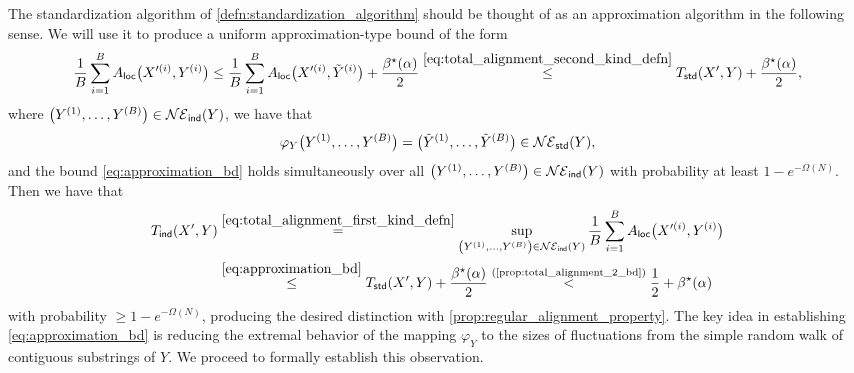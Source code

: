 \documentclass[11pt]{amsart}
\numberwithin{equation}{section}
\numberwithin{equation}{section}
\newcommand{\1}{\mathbbm{1}}
\newcommand{\ind}{\textup{\textsf{ind}}}
\newcommand{\std}{\textup{\textsf{std}}}
\newcommand{\loc}{\textup{\textsf{loc}}}
\theoremstyle{definition}
\begin{document}
The standardization algorithm of \cref{defn:standardization_algorithm} should be thought of as an approximation algorithm in the following sense. We will use it to produce a uniform approximation-type bound of the form
\begin{align} \label{eq:approximation_bd}
    \frac{1}{B}\sum_{i=1}^B A_\loc\big(X'^{(i)}, Y^{(i)}\big) \leq \frac{1}{B} \sum_{i=1}^B A_\loc\big(X'^{(i)}, \tilde{Y}^{(i)}\big) + \frac{\beta^\star(\alpha)}{2} \stackrel{\eqref{eq:total_alignment_second_kind_defn}}{\leq} T_\std(X', Y) + \frac{\beta^\star(\alpha)}{2},
\end{align}
where $\big( Y^{(1)}, \dots, Y^{(B)} \big) \in \mathcal{NE}_\ind(Y)$, we have that
\begin{align*}
    \varphi_{Y}\big( Y^{(1)}, \dots, Y^{(B)} \big) = \big( \Tilde{Y}^{(1)}, \dots, \Tilde{Y}^{(B)} \big) \in \mathcal{NE}_\std(Y),
\end{align*}
and the bound \eqref{eq:approximation_bd} holds simultaneously over all $\big( Y^{(1)}, \dots, Y^{(B)} \big) \in \mathcal{NE}_\ind(Y)$ with probability at least $1 - e^{-\Omega(N)}$. Then we have that
\begin{align}
    T_\ind(X', Y) & \stackrel{\eqref{eq:total_alignment_first_kind_defn}}{=} \sup_{\left( Y^{(1)}, \dots, Y^{(B)} \right) \in \mathcal{NE}_\ind(Y)} \frac{1}{B}\sum_{i=1}^B A_\loc\big(X'^{(i)}, Y^{(i)}\big) \nonumber \\
    & \stackrel{\eqref{eq:approximation_bd}}{\leq} T_\std(X', Y) + \frac{\beta^\star(\alpha)}{2} \stackrel{\text{(\cref{prop:total_alignment_2_bd})}}{<} \frac{1}{2} + \beta^\star(\alpha) \label{eq:T_1_probable_bound}
\end{align}
with probability $\geq 1 - e^{-\Omega(N)}$, producing the desired distinction with \cref{prop:regular_alignment_property}. The key idea in establishing \eqref{eq:approximation_bd} is reducing the extremal behavior of the mapping $\varphi_{Y}$ to the sizes of fluctuations from the simple random walk of contiguous substrings of $Y$. We proceed to formally establish this observation.
\end{document}

